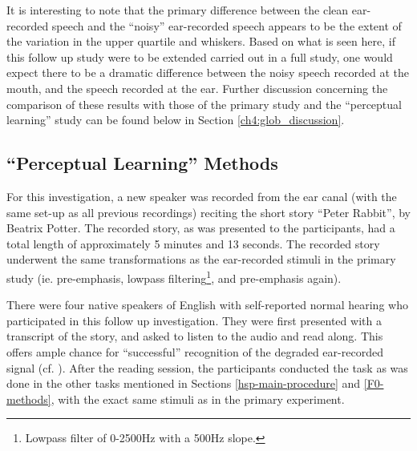 \documentclass[dissertation,copyright]{uathesis}
\begin{document}
It is interesting to note that the primary difference between the clean ear-recorded speech and the ``noisy'' ear-recorded speech appears to be the extent of the variation in the upper quartile and whiskers.  Based on what is seen here, if this follow up study were to be extended carried out in a full study, one would expect there to be a dramatic difference between the noisy speech recorded at the mouth, and the speech recorded at the ear.
Further discussion concerning the comparison of these results with those of the primary study and the ``perceptual learning'' study can be found below in Section \ref{ch4:glob_discussion}.


\subsection{``Perceptual Learning'' Methods}

For this investigation, a new speaker was recorded from the ear canal (with the same set-up as all previous recordings) reciting the short story ``Peter Rabbit'', by Beatrix Potter.  The recorded story, as was presented to the participants, had a total length of approximately 5 minutes and 13 seconds.  The recorded story underwent the same transformations as the ear-recorded stimuli in the primary study (ie. pre-emphasis, lowpass filtering\footnote{Lowpass filter of 0-2500Hz with a 500Hz slope.}, and pre-emphasis again).

There were four native speakers of English with self-reported normal hearing who participated in this follow up investigation.  They were first presented with a transcript of the story, and asked to listen to the audio and read along.  This offers ample chance for ``successful'' recognition of the degraded ear-recorded signal (cf. \cite{davis:05}).  After the reading session, the participants conducted the task as was done in the other tasks mentioned in Sections \ref{hsp-main-procedure} and \ref{F0-methods}, with the exact same stimuli as in the primary experiment.
\end{document}
